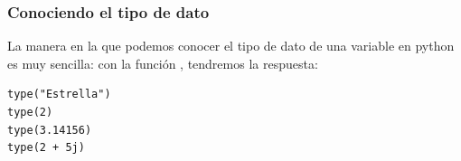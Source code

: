 \documentclass[12pt]{beamer}
\begin{document}
\begin{frame}[fragile]
\frametitle{Conociendo el tipo de dato}
La manera en la que podemos conocer el tipo de dato de una variable en python es muy sencilla: con la función , tendremos la respuesta:
\pause
\begin{lstlisting}[caption=Usando la función type()]
type("Estrella")
type(2)
type(3.14156)
type(2 + 5j)
\end{lstlisting}
\end{frame}
\end{document}
